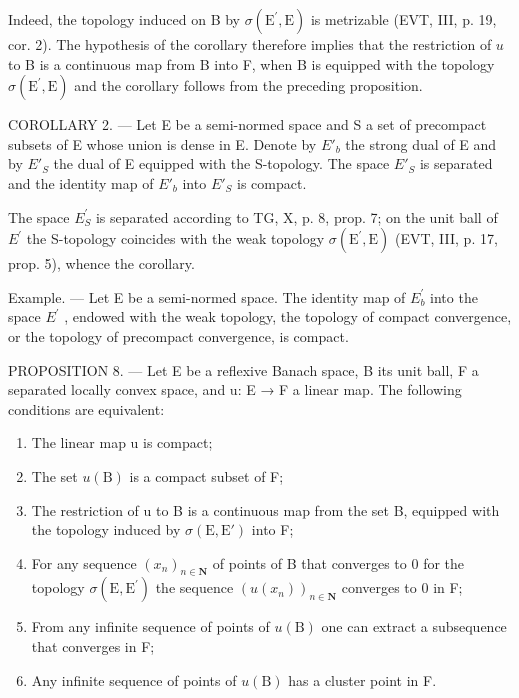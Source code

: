 Indeed, the topology induced on B by \(\sigma(\mathrm{E}^{\prime},\mathrm{E})\) is metrizable (EVT, III, p. 19, cor. 2). The hypothesis of the corollary therefore implies that the restriction of \(u\) to B is a continuous map from B into F, when B is equipped with the topology \(\sigma(\mathrm{E}^{\prime},\mathrm{E})\) and the corollary follows from the preceding proposition.

COROLLARY 2. --- Let E be a semi-normed space and S a set of precompact subsets of E whose union is dense in E. Denote by \(E'_{b}\) the strong dual of E and by \(E'_{S}\) the dual of E equipped with the S-topology. The space \(E'_{S}\) is separated and the identity map of \(E'_{b}\) into \(E'_{S}\) is compact.

The space \(E_{S}^{\prime}\) is separated according to TG, X, p. 8, prop. 7; on the unit ball of \(E^{\prime}\) the S-topology coincides with the weak topology \(\sigma(\mathrm{E}^{\prime},\mathrm{E})\) (EVT, III, p. 17, prop. 5), whence the corollary.

Example. --- Let E be a semi-normed space. The identity map of \(E_{b}^{\prime}\) into the space \(E^{\prime}\) , endowed with the weak topology, the topology of compact convergence, or the topology of precompact convergence, is compact.

PROPOSITION 8. --- Let E be a reflexive Banach space, B its unit ball, F a separated locally convex space, and u: E → F a linear map. The following conditions are equivalent:

\begin{enumerate}
\def\labelenumi{(\roman{enumi})}
\item
  The linear map u is compact;
\item
  The set \(u(\mathrm{B})\) is a compact subset of F;
\item
  The restriction of u to B is a continuous map from the set B, equipped with the topology induced by \(\sigma(\mathrm{E},\mathrm{E}')\) into F;
\item
  For any sequence \((x_{n})_{n\in \mathbf{N}}\) of points of B that converges to 0 for the topology \(\sigma (\mathrm{E},\mathrm{E}^{\prime})\) the sequence \((u(x_n))_{n\in \mathbf{N}}\) converges to 0 in F;
\item
  From any infinite sequence of points of \(u(\mathrm{B})\) one can extract a subsequence that converges in F;
\item
  Any infinite sequence of points of \(u(\mathrm{B})\) has a cluster point in F.
\end{enumerate}

